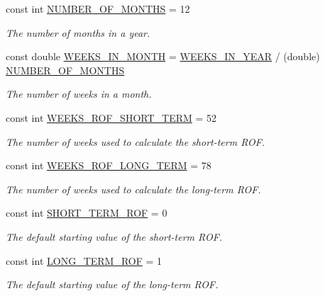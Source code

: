\begin{DoxyCompactItemize}
const int \mbox{\hyperlink{classConstants_aced78823f6427b8251297408fa8e6555}{N\+U\+M\+B\+E\+R\+\_\+\+O\+F\+\_\+\+M\+O\+N\+T\+HS}} = 12
\begin{DoxyCompactList}\small\item\em The number of months in a year. \end{DoxyCompactList}\item 
const double \mbox{\hyperlink{classConstants_a74ad24a642858cc193c678329422e5ad}{W\+E\+E\+K\+S\+\_\+\+I\+N\+\_\+\+M\+O\+N\+TH}} = \mbox{\hyperlink{classConstants_a19e84af3cbc6e1318beb22408c2a1f2f}{W\+E\+E\+K\+S\+\_\+\+I\+N\+\_\+\+Y\+E\+AR}} / (double) \mbox{\hyperlink{classConstants_aced78823f6427b8251297408fa8e6555}{N\+U\+M\+B\+E\+R\+\_\+\+O\+F\+\_\+\+M\+O\+N\+T\+HS}}
\begin{DoxyCompactList}\small\item\em The number of weeks in a month. \end{DoxyCompactList}\item 
const int \mbox{\hyperlink{classConstants_a0317a1ca51d926d052cf05cdc9084c69}{W\+E\+E\+K\+S\+\_\+\+R\+O\+F\+\_\+\+S\+H\+O\+R\+T\+\_\+\+T\+E\+RM}} = 52
\begin{DoxyCompactList}\small\item\em The number of weeks used to calculate the short-\/term R\+OF. \end{DoxyCompactList}\item 
const int \mbox{\hyperlink{classConstants_a9c3126b36f6a31b4c94e2a75f99a64c2}{W\+E\+E\+K\+S\+\_\+\+R\+O\+F\+\_\+\+L\+O\+N\+G\+\_\+\+T\+E\+RM}} = 78
\begin{DoxyCompactList}\small\item\em The number of weeks used to calculate the long-\/term R\+OF. \end{DoxyCompactList}\item 
const int \mbox{\hyperlink{classConstants_ab10a2c333b2bada353b0eb77cdf98480}{S\+H\+O\+R\+T\+\_\+\+T\+E\+R\+M\+\_\+\+R\+OF}} = 0
\begin{DoxyCompactList}\small\item\em The default starting value of the short-\/term R\+OF. \end{DoxyCompactList}\item 
const int \mbox{\hyperlink{classConstants_a24006f6443ebe1696dc264eafd778b02}{L\+O\+N\+G\+\_\+\+T\+E\+R\+M\+\_\+\+R\+OF}} = 1
\begin{DoxyCompactList}\small\item\em The default starting value of the long-\/term R\+OF. \end{DoxyCompactList}\item 

\end{DoxyCompactItemize}
